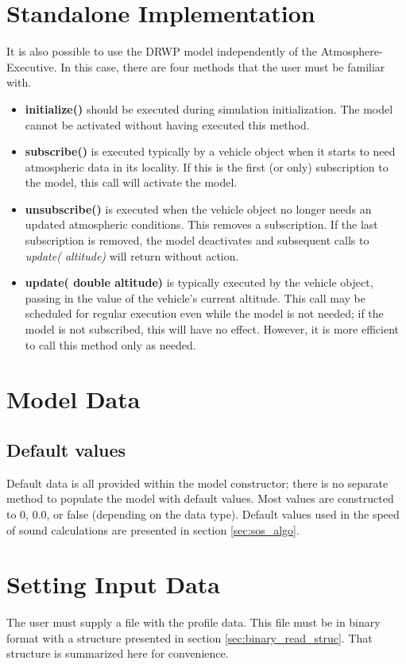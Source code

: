 \documentclass[11pt,fleqn]{report}
\begin{document}
\section{Standalone Implementation}
It is also possible to use the DRWP model independently of the
Atmosphere-Executive. In this case, there are four methods that the user
must be familiar with.
\begin{itemize}
\item \textbf{initialize()} should be executed during simulation
  initialization. The model cannot be activated without having executed this
  method.
\item \textbf{subscribe()} is executed typically by a vehicle object when it
  starts to need atmospheric data in its locality. If this is the first (or
  only) subscription to the model, this call will activate the model.
\item \textbf{unsubscribe()} is executed when the vehicle object no longer
  needs an updated atmospheric conditions. This removes a subscription. If
  the last subscription is removed, the model deactivates and subsequent
  calls to \textit{update( altitude)} will return without action.
\item \textbf{update( double altitude)} is typically executed by the vehicle
  object, passing in the value of the vehicle's current altitude. This call
  may be scheduled for regular execution even while the model is not needed;
  if the model is not subscribed, this will have no effect. However, it is
  more efficient to call this method only as needed.
\end{itemize}

\section{Model Data}
\subsection{Default values}
Default data is all provided within the model constructor; there is no
separate method to populate the model with default values.
Most values are constructed to 0, 0.0, or false (depending on the data type).
Default values used in the speed of sound calculations are presented in
section \ref{sec:sos_algo}.

\section{Setting Input Data}\label{sec:input_data}
The user must supply a file with the profile data.
This file must be in binary format with a structure presented in section
\ref{sec:binary_read_struc}. That structure is summarized here for
convenience.
\end{document}

